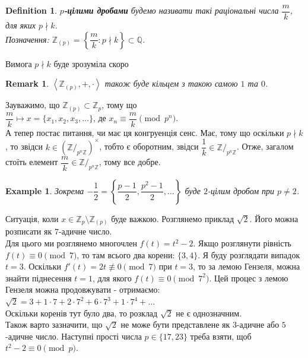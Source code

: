 \documentclass[a4paper, 10pt]{article}
\theoremstyle{theoremdd}
\theoremstyle{theoremdd}
\newtheorem{definition}[theorem]{Definition}
\theoremstyle{theoremdd}
\theoremstyle{theoremdd}
\newtheorem{example}[theorem]{Example}
\theoremstyle{theoremdd}
\theoremstyle{theoremdd}
\newtheorem{remark}[theorem]{Remark}
\theoremstyle{theoremdd}
\theoremstyle{theoremdd}
\begin{document}
\begin{definition}
\textbf{$p$-цілими дробами} будемо називати такі раціональні числа $\dfrac{m}{k}$, для яких $p \nmid k$.\\
Позначення: $\mathbb{Z}_{(p)} = \left\{ \dfrac{m}{k} : p \nmid k \right\} \subset \mathbb{Q}$.
\end{definition}

Вимога $p \nmid k$ буде зрозуміла скоро

\begin{remark}
$\left<\mathbb{Z}_{(p)},+,\cdot \right>$ також буде кільцем з такою самою $1$ та $0$.
\end{remark}

Зауважимо, що $\mathbb{Z}_{(p)} \subset \mathbb{Z}_p$, тому що\\
$\dfrac{m}{k} \mapsto x = \{x_1,x_2,x_3,\dots\}$, де $x_n \equiv \dfrac{m}{k} \pmod {p^n}$.\\
А тепер постає питання, чи має ця конгруенція сенс. Має, тому що оскільки $p \nmid k$, то звідси $k \in \left(\mathbb{Z}/_{p^n \mathbb{Z}}\right)^\times$, тобто є оборотним, звідси $\dfrac{1}{k} \in \mathbb{Z}/_{p^n \mathbb{Z}}$. Отже, загалом стоїть елемент $\dfrac{m}{k} \in \mathbb{Z}/_{p^n \mathbb{Z}}$, тому все добре.

\begin{example}
Зокрема $-\dfrac{1}{2} = \left\{ \dfrac{p-1}{2}, \dfrac{p^2-1}{2}, \dots \right\}$ буде $2$-цілим дробом при $p \neq 2$.
\end{example}

Ситуація, коли $x \in \mathbb{Z}_p \setminus \mathbb{Z}_{(p)}$ буде важкою. Розглянемо приклад $\sqrt{2}$. Його можна розписати як $7$-адичне число.\\
Для цього ми розглянемо многочлен $f(t) = t^2 - 2$. Якщо розглянути рівність $f(t) \equiv 0 \pmod 7$, то там всього два корени: $\{3,4\}$. Я буду розглядати випадок $t = 3$. Оскільки $f'(t) = 2t \not\equiv 0 \pmod 7$ при $t = 3$, то за лемою Гензеля, можна знайти піднесення $t = 1$, для якого $f(t) \equiv 0 \pmod {7^2}$. Цей процес з лемою Гензеля можна продовжувати - отримаємо:\\
$\sqrt{2} = 3 + 1 \cdot 7 + 2 \cdot 7^2 + 6 \cdot 7^3 + 1 \cdot 7^4 + \dots$\\
Оскільки коренів тут було два, то розклад $\sqrt{2}$ не є однозначним.
\bigskip \\
Також варто зазначити, що $\sqrt{2}$ не може бути представлене як $3$-адичне або $5$-адичне число. Наступні прості числа $p \in \{17,23\}$ треба взяти, щоб $t^2-2 \equiv 0 \pmod p$.
\end{document}
